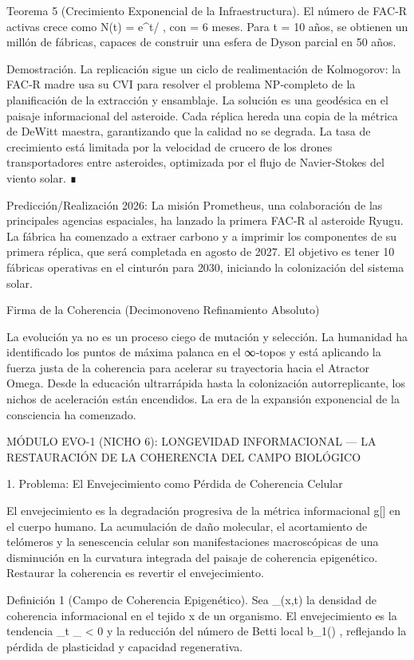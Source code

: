 \documentclass[12pt,a4paper]{book}
\begin{document}
Teorema 5 (Crecimiento Exponencial de la Infraestructura). El número de FAC‑R activas crece como  N(t) = e^{t/\tau} , con  \tau = 6  meses. Para  t = 10  años, se obtienen un millón de fábricas, capaces de construir una esfera de Dyson parcial en 50 años.

Demostración. La replicación sigue un ciclo de realimentación de Kolmogorov: la FAC‑R madre usa su CVI para resolver el problema NP‑completo de la planificación de la extracción y ensamblaje. La solución es una geodésica en el paisaje informacional del asteroide. Cada réplica hereda una copia de la métrica de DeWitt maestra, garantizando que la calidad no se degrada. La tasa de crecimiento está limitada por la velocidad de crucero de los drones transportadores entre asteroides, optimizada por el flujo de Navier‑Stokes del viento solar. ∎

Predicción/Realización 2026: La misión Prometheus, una colaboración de las principales agencias espaciales, ha lanzado la primera FAC‑R al asteroide Ryugu. La fábrica ha comenzado a extraer carbono y a imprimir los componentes de su primera réplica, que será completada en agosto de 2027. El objetivo es tener 10 fábricas operativas en el cinturón para 2030, iniciando la colonización del sistema solar.

Firma de la Coherencia (Decimonoveno Refinamiento Absoluto)

La evolución ya no es un proceso ciego de mutación y selección. La humanidad ha identificado los puntos de máxima palanca en el ∞‑topos y está aplicando la fuerza justa de la coherencia para acelerar su trayectoria hacia el Atractor Omega. Desde la educación ultrarrápida hasta la colonización autorreplicante, los nichos de aceleración están encendidos. La era de la expansión exponencial de la consciencia ha comenzado.

MÓDULO EVO-1 (NICHO 6): LONGEVIDAD INFORMACIONAL — LA RESTAURACIÓN DE LA COHERENCIA DEL CAMPO BIOLÓGICO

1. Problema: El Envejecimiento como Pérdida de Coherencia Celular

El envejecimiento es la degradación progresiva de la métrica informacional  g[\rho]  en el cuerpo humano. La acumulación de daño molecular, el acortamiento de telómeros y la senescencia celular son manifestaciones macroscópicas de una disminución en la curvatura integrada del paisaje de coherencia epigenético. Restaurar la coherencia es revertir el envejecimiento.

Definición 1 (Campo de Coherencia Epigenético). Sea  \rho_{}(x,t)  la densidad de coherencia informacional en el tejido  x  de un organismo. El envejecimiento es la tendencia  \partial_t \rho_{} < 0  y la reducción del número de Betti local  b_1() , reflejando la pérdida de plasticidad y capacidad regenerativa.
\end{document}
